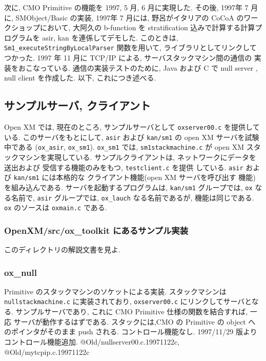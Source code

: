 次に, CMO Primitive の機能を
1997, 5 月, 6 月に実現した.
その後, 1997年 7 月に, SMObject/Basic の実装,
1997年 7 月には, 野呂がイタリアの CoCoA のワークショップにおいて,
大阿久の b-function を stratification 込みで計算する計算プログラムを
asir, kan を連係してデモした. このときは, {\tt Sm1\_executeStringByLocalParser}
関数を用いて, ライブラリとしてリンクしてつかった.
1997 年 11 月に TCP/IP による, サーバスタックマシン間の通信の
実装をおこなっている.
通信の実装テストのために, Java および C で null server , null client
を作成した. 以下, これにつき述べる.


\subsection{ サンプルサーバ, クライアント }

Open XM では, 現在のところ,
サンプルサーバとして  {\tt oxserver00.c} を提供している.
このサーバをもとにして, {\tt asir} および {\tt kan/sm1} 
の open XM サーバを試験中である ({\tt ox\_asir}, {\tt ox\_sm1}).
{\tt ox\_sm1} では, {\tt sm1stackmachine.c} が
open XM スタックマシンを実現している.
サンプルクライアントは, ネットワークにデータを送出および
受信する機能のみをもつ,  {\tt testclient.c} を提供
している. 
{\tt asir} および {\tt kan/sm1} には本格的な
クライアント機能(open XM サーバを呼び出す
機能)を組み込んである.
サーバを起動するプログラムは, {\tt kan/sm1} グループでは,
{\tt ox} なる名前で, {\tt asir} グループでは,
{\tt ox\_lauch} なる名前であるが, 機能は同じである.
{\tt ox} のソースは {\tt oxmain.c} である.

\subsubsection{OpenXM/src/ox\_toolkit にあるサンプル実装}
このディレクトリの解説文書を見よ.

\subsubsection{ ox\_null }

Primitive のスタックマシンのソケットによる実装. 
スタックマシンは {\tt nullstackmachine.c} に実装されており,
{\tt oxserver00.c} にリンクしてサーバとなる.
サンプルサーバであり, これに CMO Primitive 仕様の関数を結合すれば,
一応 サーバが動作するはずである.
スタックには,CMO の Primitive の object へのポインタがそのまま push される.
コントロール機能なし. 1997/11/29 版よりコントロール機能追加.
@Old/nullserver00.c.19971122c,
@Old/mytcpip.c.19971122c

